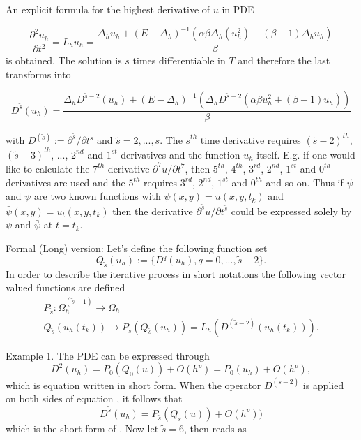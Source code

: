 \documentclass[11pt,a4paper,twoside]{article}
\begin{document}
An explicit formula for the highest derivative of $u$ in PDE  

\begin{equation}\label{Leq}
\frac{ \partial^2 u_h }{ \partial t^2 } = L_h u_h = \frac{ \Delta_h u_h + (E - \Delta_h)^{-1} ( \alpha \beta \Delta_h( u_h^2) + (\beta -1)\Delta_h u_h) }{\beta}
\end{equation}
is obtained. The solution is $s$ times differentiable in $T$ and therefore the last transforms into

\begin{equation}\label{DLeq}
D^{\tilde s} (u_h) =\frac{ \Delta_h D^{\tilde s - 2}(u_h) + (E - \Delta_h)^{-1}( \Delta_h D^{\tilde s - 2} ( \alpha \beta u_h^2  + (\beta -1)u_h) )  }{\beta} 
\end{equation}

with $D^{(\tilde s)} := \partial^{\tilde s} / \partial t^{\tilde s}$ and $\tilde s = 2,...,s$. The $\tilde s^{th}$ time derivative requires $(\tilde s-2)^{th}$, $(\tilde s-3)^{th}$, ..., $2^{nd}$ and $1^{st}$ derivatives and the function $u_h$ itself. E.g. if one would like to calculate the $7^{th}$ derivative $\partial^7 u / \partial t^7$, then $5^{th}$, $4^{th}$, $3^{rd}$, $2^{nd}$, $1^{st}$ and $0^{th}$ derivatives are used and the $5^{th}$ requires  $3^{rd}$, $2^{nd}$, $1^{st}$ and $0^{th}$ and so on.  Thus if $\psi$ and $\bar \psi$ are two known functions with $\psi(x,y) = u(x,y, t_k)$ and $\bar \psi(x,y) = u_t(x,y, t_k)$ then the derivative $\partial^{\tilde s} u / \partial t^{\tilde s}$ could be expressed solely by $\psi$ and $\bar \psi$ at $t = t_k$.

\iffalse
Formal (Long) version:
Let's define the following function set
\begin{equation}
Q_{\tilde s}(u_h) := \{ D^{q}(u_h), q = 0, ... , \tilde s - 2 \}.
\end{equation}
In order to describe the iterative process in short notations the following vector valued functions are defined
\begin{align*} 
P_{\tilde s} : \Omega_h^{(\tilde s - 1)} \rightarrow \Omega_h
\\ Q_{\tilde s}(u_h(t_k)) \rightarrow P_{\tilde s} (Q_{\tilde s}(u_h) ) = L_h( D^{(\tilde s - 2)} (u_h(t_k)) ).
\end{align*}

Example 1. The PDE  can be expressed through 
\begin{equation}\label{example}
D^{2}(u_h) = P_0(Q_0(u)) + O(h^p) = P_0(u_h) + O(h^p),
\end{equation}
which is equation  written in short form. When the operator $D^{(\tilde s -2)}$ is applied on both sides of equation , it follows that
\begin{equation}\label{DPeq}
D^{\tilde s}(u_h) = P_{\tilde s}(Q_{\tilde s}(u)) + O(h^p))
\end{equation}
which is the short form of . Now let $\tilde s = 6$, then  reads as
\end{document}
